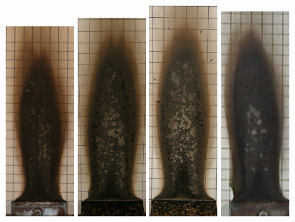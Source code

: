 \documentclass[twoside]{uocthesis}
\begin{document}
{\begin{figure}[p]
	\includegraphics[width=1.0in]{../Figures/GBNG24_IMG_9020}
	\includegraphics[width=1.0in]{../Figures/GBNG25_P5130419}
	\includegraphics[width=1.0in]{../Figures/GBNG26_P5130427}
	\includegraphics[width=1.0in]{../Figures/GBNG27}

\end{figure}}
\end{document}
